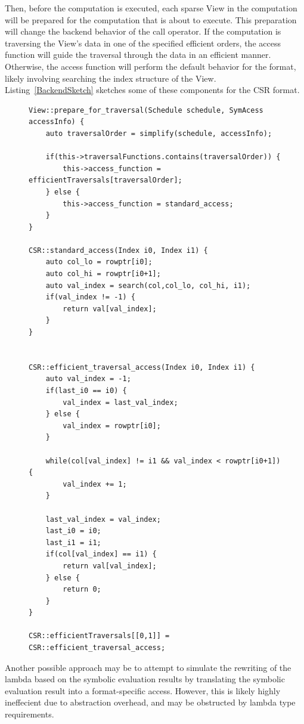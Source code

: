 \documentclass{article}
\begin{document}
Then, before the computation is executed, each sparse View in the computation will be prepared for the computation that is about to execute.
This preparation will change the backend behavior of the call operator.
If the computation is traversing the View's data in one of the specified efficient orders, the access function will guide the traversal through the data in an efficient manner.
Otherwise, the access function will perform the default behavior for the format, likely involving searching the index structure of the View.
Listing~\ref{BackendSketch} sketches some of these components for the CSR format. 

\begin{figure}
\begin{lstlisting}[caption={Sketch of the backend for efficient iteration}, label={BackendSketch}]
View::prepare_for_traversal(Schedule schedule, SymAcess accessInfo) {
    auto traversalOrder = simplify(schedule, accessInfo);

    if(this->traversalFunctions.contains(traversalOrder)) {
        this->access_function = efficientTraversals[traversalOrder];
    } else {
        this->access_function = standard_access;
    }
}

CSR::standard_access(Index i0, Index i1) {
    auto col_lo = rowptr[i0];
    auto col_hi = rowptr[i0+1];
    auto val_index = search(col,col_lo, col_hi, i1);
    if(val_index != -1) {
        return val[val_index];
    }
}


CSR::efficient_traversal_access(Index i0, Index i1) {
    auto val_index = -1;
    if(last_i0 == i0) {
        val_index = last_val_index;
    } else {
        val_index = rowptr[i0];
    }

    while(col[val_index] != i1 && val_index < rowptr[i0+1]) {
        val_index += 1;
    }

    last_val_index = val_index;
    last_i0 = i0;
    last_i1 = i1;
    if(col[val_index] == i1) {
        return val[val_index];
    } else {
        return 0;
    }
}

CSR::efficientTraversals[[0,1]] = CSR::efficient_traversal_access;
\end{lstlisting}
\end{figure}

Another possible approach may be to attempt to simulate the rewriting of the lambda based on the symbolic evaluation results by translating the symbolic evaluation result into a format-specific access.
However, this is likely highly ineffecient due to abstraction overhead, and may be obstructed by lambda type requirements.
\end{document}
